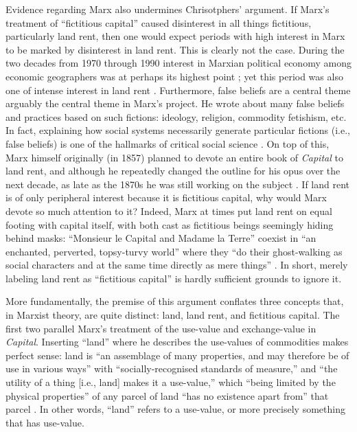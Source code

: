 Evidence regarding Marx also undermines Chrisotphers' argument. If
Marx's treatment of ``fictitious capital'' caused disinterest in
all things fictitious, particularly land rent, then one would expect
periods with high interest in Marx to be marked by disinterest in
land rent. This is clearly not the case. During the two decades from
1970 through 1990 interest in Marxian political economy among economic
geographers was at perhaps its highest point \citep[488 - 491]{scott07economic};
yet this period was also one of intense interest in land rent \citep{haila1990thetheory}.
Furthermore, false beliefs are a central theme \textendash{} arguably
the central theme \textendash{} in Marx's project. He wrote about
many false beliefs and practices based on such fictions: ideology,
religion, commodity fetishism, etc. In fact, explaining how social
systems necessarily generate particular fictions (i.e., false beliefs)
is one of the hallmarks of critical social science \citep{sayer1critical}.
On top of this, Marx himself originally (in 1857) planned to devote
an entire book of \emph{Capital} to land rent, and although he repeatedly
changed the outline for his opus over the next decade, as late as
the 1870s he was still working on the subject \citep[12 -13, 55 - 56, 22 ]{rodolsky1977themaking}.
If land rent is of only peripheral interest because it is fictitious
capital, why would Marx devote so much attention to it? Indeed, Marx
at times put land rent on equal footing with capital itself, with
both cast as fictitious beings seemingly hiding behind masks: ``Monsieur
le Capital and Madame la Terre'' coexist in ``an enchanted, perverted,
topsy-turvy world'' where they ``do their ghost-walking as social
characters and at the same time directly as mere things'' \citep[830]{marx1967capital}.
In short, merely labeling land rent as ``fictitious capital'' is
hardly sufficient grounds to ignore it.

More fundamentally, the premise of this argument conflates three concepts
that, in Marxist theory, are quite distinct: land, land rent, and
fictitious capital. The first two parallel Marx's treatment of the
use-value and exchange-value in \emph{Capital}. Inserting ``land''
where he describes the use-values of commodities makes perfect sense:
land is ``an assemblage of many properties, and may therefore be
of use in various ways'' with ``socially-recognised standards of
measure,'' and ``the utility of a thing {[}i.e., land{]} makes it
a use-value,'' which ``being limited by the physical properties''
of any parcel of land ``has no existence apart from'' that parcel
\citep[35 - 36]{marx1967capital2}. In other words, ``land'' refers
to a use-value, or more precisely something that has use-value.


